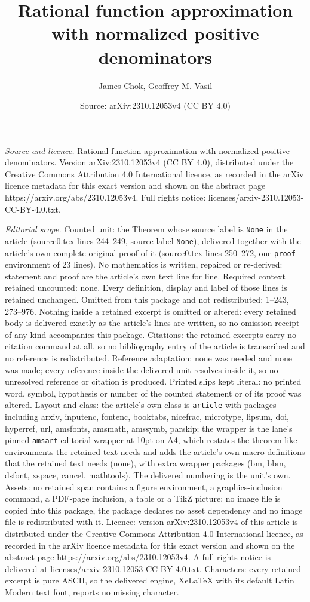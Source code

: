 \documentclass[10pt,a4paper]{amsart}
\title[Rational function approximation with normalized positive den]{Rational function approximation with normalized positive denominators}
\author{James Chok, Geoffrey M. Vasil}
\date{Source: arXiv:2310.12053v4 (CC BY 4.0)}
\begin{document}
\maketitle

\noindent\emph{Source and licence.} Rational function approximation with normalized positive denominators. Version arXiv:2310.12053v4 (CC BY 4.0), distributed under the Creative Commons Attribution 4.0 International licence, as recorded in the arXiv licence metadata for this exact version and shown on the abstract page https://arxiv.org/abs/2310.12053v4. Full rights notice: licenses/arxiv-2310.12053-CC-BY-4.0.txt.\par\smallskip

\noindent\textit{Editorial scope.} Counted unit: the Theorem whose source label is \texttt{None} in the article (source0.tex lines 244--249, source label \texttt{None}), delivered together with the article's own complete original proof of it (source0.tex lines 250--272, one \texttt{proof} environment of 23 lines). No mathematics is written, repaired or re-derived: statement and proof are the article's own text line for line. Required context retained uncounted: none. Every definition, display and label of those lines is retained unchanged. Omitted from this package and not redistributed: 1--243, 273--976. Nothing inside a retained excerpt is omitted or altered: every retained body is delivered exactly as the article's lines are written, so no omission receipt of any kind accompanies this package. Citations: the retained excerpts carry no citation command at all, so no bibliography entry of the article is transcribed and no reference is redistributed. Reference adaptation: none was needed and none was made; every reference inside the delivered unit resolves inside it, so no unresolved reference or citation is produced. Printed slips kept literal: no printed word, symbol, hypothesis or number of the counted statement or of its proof was altered. Layout and class: the article's own class is \texttt{article} with packages including arxiv, inputenc, fontenc, booktabs, nicefrac, microtype, lipsum, doi, hyperref, url, amsfonts, amsmath, amssymb, parskip; the wrapper is the lane's pinned \texttt{amsart} editorial wrapper at 10pt on A4, which restates the theorem-like environments the retained text needs and adds the article's own macro definitions that the retained text needs (none), with extra wrapper packages (bm, bbm, dsfont, xspace, cancel, mathtools). The delivered numbering is the unit's own. Assets: no retained span contains a figure environment, a graphics-inclusion command, a PDF-page inclusion, a table or a TikZ picture; no image file is copied into this package, the package declares no asset dependency and no image file is redistributed with it. Licence: version arXiv:2310.12053v4 of this article is distributed under the Creative Commons Attribution 4.0 International licence, as recorded in the arXiv licence metadata for this exact version and shown on the abstract page https://arxiv.org/abs/2310.12053v4. A full rights notice is delivered at licenses/arxiv-2310.12053-CC-BY-4.0.txt. Characters: every retained excerpt is pure ASCII, so the delivered engine, XeLaTeX with its default Latin Modern text font, reports no missing character.
\end{document}
